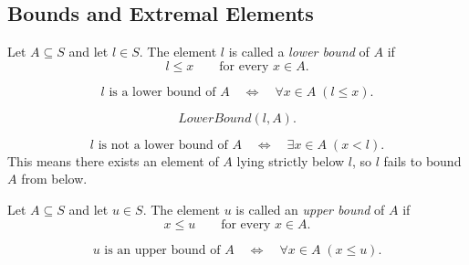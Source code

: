 
\subsection*{Bounds and Extremal Elements}

\begin{tcolorbox}[colback=propbox, colframe=propborder, arc=2pt,
  left=6pt, right=6pt, top=4pt, bottom=4pt,
  title={\small\textbf{Definition (Lower Bound)}},
  fonttitle=\small\bfseries]
\begin{definition}
\label{def:lower-bound}
Let $A \subseteq S$ and let $l \in S$. The element $l$ is called a
\emph{lower bound} of $A$ if
\[
l \le x
\qquad \text{for every } x \in A.
\]
\end{definition}
\end{tcolorbox}

\begin{remark*}
\[
l \text{ is a lower bound of } A
\quad\Longleftrightarrow\quad
\forall x \in A \; (l \le x).
\]
\end{remark*}

\begin{remark*}
\[
LowerBound(l,A).
\]
\end{remark*}

\begin{remark*}
\[
l \text{ is not a lower bound of } A
\quad\Longleftrightarrow\quad
\exists x \in A \; (x < l).
\]
This means there exists an element of $A$ lying strictly below $l$, so $l$ fails to bound $A$
from below.
\end{remark*}

\begin{tcolorbox}[colback=propbox, colframe=propborder, arc=2pt,
  left=6pt, right=6pt, top=4pt, bottom=4pt,
  title={\small\textbf{Definition (Upper Bound)}},
  fonttitle=\small\bfseries]
\begin{definition}
\label{def:upper-bound}
Let $A \subseteq S$ and let $u \in S$. The element $u$ is called an
\emph{upper bound} of $A$ if
\[
x \le u
\qquad \text{for every } x \in A.
\]
\end{definition}
\end{tcolorbox}

\begin{remark*}
\[
u \text{ is an upper bound of } A
\quad\Longleftrightarrow\quad
\forall x \in A \; (x \le u).
\]
\end{remark*}

